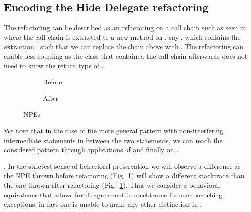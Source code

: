\subsection{Encoding the Hide Delegate refactoring}\label{sec:hideDelegate}

The  refactoring can be described as an  refactoring on a call chain such as seen in 
where the call chain is extracted to a new method on , say , which contains the extraction , such that we can replace the chain above with .
The refactoring can enable less coupling as the class that contained the call chain afterwards does not need to know the return type of .

\begin{figure}[tbp]
  \centering
  \begin{subfigure}{.3\linewidth}
    
    \caption{Before}
    \label{fig:hd-npe-before}
  \end{subfigure}
  \begin{subfigure}{.3\linewidth}
    
    \caption{After}
    \label{fig:hd-npe-after}    
  \end{subfigure}
  \caption{NPEs}
  \label{fig:NPEs}
\end{figure}

We note that in the case of the more general pattern  with non-interfering intermediate statements in between the two statements,
we can reach the considered pattern through applications of  and finally  on .


. In the strictest sense of behavioral preservation
we will observe a difference as the NPE thrown before refactoring (Fig.~\ref{fig:hd-npe-before}) will show a different stacktrace than the one thrown after refactoring (Fig.~\ref{fig:hd-npe-before}).
Thus we consider a behavioral equivalence that allows for disagreement in stacktraces for such matching exceptions; in fact one is unable to make any other distinction in \Refinity{}.

